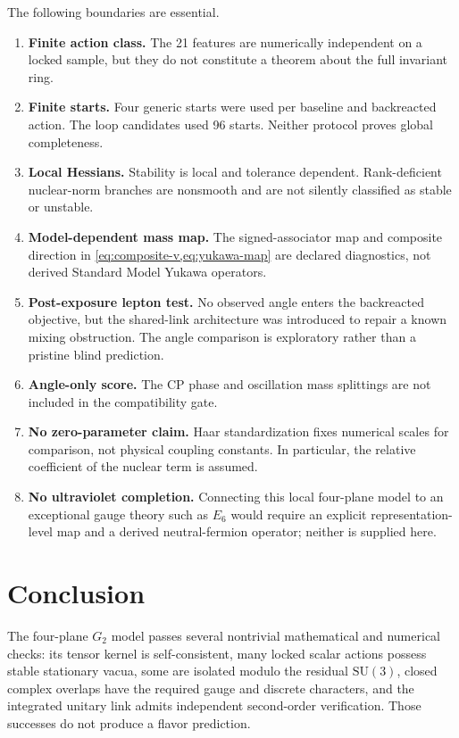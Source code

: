 \documentclass[11pt]{article}
\newcommand{\SU}{\mathrm{SU}}
\begin{document}
The following boundaries are essential.
\begin{enumerate}[leftmargin=2.1em]
  \item \textbf{Finite action class.}  The 21 features are numerically independent on a locked sample, but they do not constitute a theorem about the full invariant ring.
  \item \textbf{Finite starts.}  Four generic starts were used per baseline and backreacted action.  The loop candidates used 96 starts.  Neither protocol proves global completeness.
  \item \textbf{Local Hessians.}  Stability is local and tolerance dependent.  Rank-deficient nuclear-norm branches are nonsmooth and are not silently classified as stable or unstable.
  \item \textbf{Model-dependent mass map.}  The signed-associator map and composite direction in \cref{eq:composite-v,eq:yukawa-map} are declared diagnostics, not derived Standard Model Yukawa operators.
  \item \textbf{Post-exposure lepton test.}  No observed angle enters the backreacted objective, but the shared-link architecture was introduced to repair a known mixing obstruction.  The angle comparison is exploratory rather than a pristine blind prediction.
  \item \textbf{Angle-only score.}  The CP phase and oscillation mass splittings are not included in the compatibility gate.
  \item \textbf{No zero-parameter claim.}  Haar standardization fixes numerical scales for comparison, not physical coupling constants.  In particular, the relative coefficient of the nuclear term is assumed.
  \item \textbf{No ultraviolet completion.}  Connecting this local four-plane model to an exceptional gauge theory such as $E_6$ would require an explicit representation-level map and a derived neutral-fermion operator; neither is supplied here.
\end{enumerate}

\section{Conclusion}

The four-plane $G_2$ model passes several nontrivial mathematical and numerical checks: its tensor kernel is self-consistent, many locked scalar actions possess stable stationary vacua, some are isolated modulo the residual $\SU(3)$, closed complex overlaps have the required gauge and discrete characters, and the integrated unitary link admits independent second-order verification.  Those successes do not produce a flavor prediction.
\end{document}
